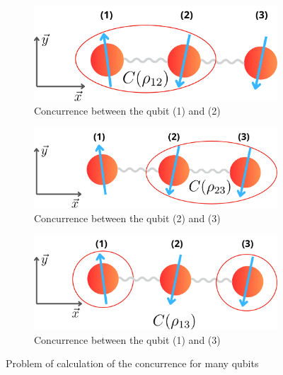 \begin{figure}[h!]
    \centering
    \begin{subfigure}[b]{0.3\textwidth}
        \centering
        \includegraphics[width=\textwidth]{methodology/partial_trace_1.pdf}
        \caption{\centering Concurrence between the qubit (1) and (2)}
        \label{fig:Concurrence between the qubit (1) and (2)}
    \end{subfigure}
    \hfill
    \begin{subfigure}[b]{0.3\textwidth}
        \centering
        \includegraphics[width=\textwidth]{methodology/partial_trace_2.pdf}
        \caption{\centering Concurrence between the qubit (2) and (3)}
        \label{fig:Concurrence between the qubit (2) and (3)}
    \end{subfigure}
    \hfill
    \begin{subfigure}[b]{0.3\textwidth}
        \centering
        \includegraphics[width=\textwidth]{methodology/partial_trace_3.pdf}
        \caption{\centering Concurrence between the qubit (1) and (3)}
        \label{fig:Concurrence between the qubit (1) and (3)}
    \end{subfigure}
    \caption{Problem of calculation of the concurrence for many qubits}
    \label{fig:partial_traces}
\end{figure}



